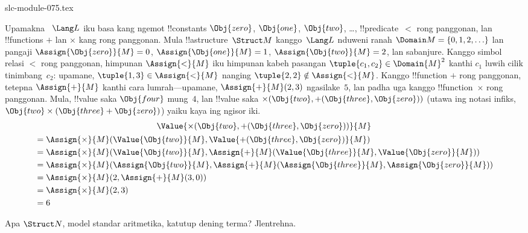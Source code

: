 \begin{filecontents*}[overwrite]{slc-module-075.tex}
\begin{ex}
Upamakna ~$\Lang L$ iku basa kang ngemot !!{constant}s $\Obj{zero}$,
$\Obj{one}$, $\Obj{two}$, \dots, !!{predicate}~$<$ rong panggonan,
lan !!{function}s $+$ lan $\times$ kang rong panggonan. Mula
!!a{structure}~$\Struct M$ kanggo~$\Lang L$ nduweni ranah
$\Domain M = \{0, 1, 2, \ldots \}$ lan pangaji
$\Assign{\Obj{zero}}{M} = 0$, $\Assign{\Obj{one}}{M} = 1$,
$\Assign{\Obj{two}}{M} = 2$, lan sabanjure. Kanggo simbol relasi
$<$ rong panggonan, himpunan $\Assign{<}{M}$ iku himpunan kabeh
pasangan $\tuple{c_1, c_2} \in \Domain{M}^2$ kanthi $c_1$
luwih cilik tinimbang~$c_2$: upamane, $\tuple{1, 3} \in
\Assign{<}{M}$ nanging $\tuple{2, 2} \notin \Assign{<}{M}$.
Kanggo !!{function} $+$ rong panggonan, tetepna $\Assign{+}{M}$
kanthi cara lumrah---upamane, $\Assign{+}{M}(2,3)$ ngasilake~$5$,
lan padha uga kanggo !!{function}~$\times$ rong panggonan.
Mula, !!{value} saka $\Obj{four}$ mung~$4$, lan !!{value}
saka $\times(\Obj{two},
+(\Obj{three},\Obj{zero}))$ (utawa ing notasi infiks,
$\Obj{two} \times (\Obj{three} + \Obj{zero})$) yaiku
kaya ing ngisor iki.
\begin{multline*}
\Value{\times(\Obj{two}, +(\Obj{three},\Obj{zero}))}{M} \\
\begin{aligned}
& =\Assign{\times}{M}(\Value{\Obj{two}}{M}, \Value{+(\Obj{three}, \Obj{zero})}{M})\\
& = \Assign{\times}{M}(\Value{\Obj{two}}{M}, \Assign{+}{M}(\Value{\Obj{three}}{M},
\Value{\Obj{zero}}{M})) \\
& = \Assign{\times}{M}(\Assign{\Obj{two}}{M}, \Assign{+}{M}(\Assign{\Obj{three}}{M},
\Assign{\Obj{zero}}{M})) \\
& = \Assign{\times}{M}(2, \Assign{+}{M}(3, 0)) \\
& = \Assign{\times}{M}(2, 3) \\
& = 6
\end{aligned}
\end{multline*}
\end{ex}

\begin{prob}
Apa $\Struct N$, model standar aritmetika, katutup dening terma? Jlentrehna.
\end{prob}


\end{filecontents*}

